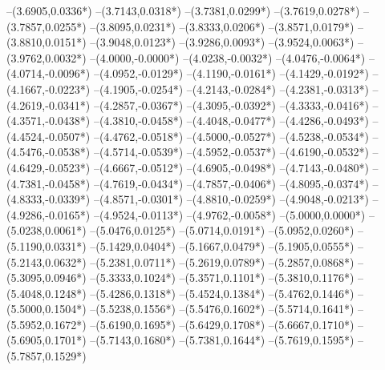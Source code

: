 {	--(3.6905,{0.0336*\yskala})
	--(3.7143,{0.0318*\yskala})
	--(3.7381,{0.0299*\yskala})
	--(3.7619,{0.0278*\yskala})
	--(3.7857,{0.0255*\yskala})
	--(3.8095,{0.0231*\yskala})
	--(3.8333,{0.0206*\yskala})
	--(3.8571,{0.0179*\yskala})
	--(3.8810,{0.0151*\yskala})
	--(3.9048,{0.0123*\yskala})
	--(3.9286,{0.0093*\yskala})
	--(3.9524,{0.0063*\yskala})
	--(3.9762,{0.0032*\yskala})
	--(4.0000,{-0.0000*\yskala})
	--(4.0238,{-0.0032*\yskala})
	--(4.0476,{-0.0064*\yskala})
	--(4.0714,{-0.0096*\yskala})
	--(4.0952,{-0.0129*\yskala})
	--(4.1190,{-0.0161*\yskala})
	--(4.1429,{-0.0192*\yskala})
	--(4.1667,{-0.0223*\yskala})
	--(4.1905,{-0.0254*\yskala})
	--(4.2143,{-0.0284*\yskala})
	--(4.2381,{-0.0313*\yskala})
	--(4.2619,{-0.0341*\yskala})
	--(4.2857,{-0.0367*\yskala})
	--(4.3095,{-0.0392*\yskala})
	--(4.3333,{-0.0416*\yskala})
	--(4.3571,{-0.0438*\yskala})
	--(4.3810,{-0.0458*\yskala})
	--(4.4048,{-0.0477*\yskala})
	--(4.4286,{-0.0493*\yskala})
	--(4.4524,{-0.0507*\yskala})
	--(4.4762,{-0.0518*\yskala})
	--(4.5000,{-0.0527*\yskala})
	--(4.5238,{-0.0534*\yskala})
	--(4.5476,{-0.0538*\yskala})
	--(4.5714,{-0.0539*\yskala})
	--(4.5952,{-0.0537*\yskala})
	--(4.6190,{-0.0532*\yskala})
	--(4.6429,{-0.0523*\yskala})
	--(4.6667,{-0.0512*\yskala})
	--(4.6905,{-0.0498*\yskala})
	--(4.7143,{-0.0480*\yskala})
	--(4.7381,{-0.0458*\yskala})
	--(4.7619,{-0.0434*\yskala})
	--(4.7857,{-0.0406*\yskala})
	--(4.8095,{-0.0374*\yskala})
	--(4.8333,{-0.0339*\yskala})
	--(4.8571,{-0.0301*\yskala})
	--(4.8810,{-0.0259*\yskala})
	--(4.9048,{-0.0213*\yskala})
	--(4.9286,{-0.0165*\yskala})
	--(4.9524,{-0.0113*\yskala})
	--(4.9762,{-0.0058*\yskala})
	--(5.0000,{0.0000*\yskala})
	--(5.0238,{0.0061*\yskala})
	--(5.0476,{0.0125*\yskala})
	--(5.0714,{0.0191*\yskala})
	--(5.0952,{0.0260*\yskala})
	--(5.1190,{0.0331*\yskala})
	--(5.1429,{0.0404*\yskala})
	--(5.1667,{0.0479*\yskala})
	--(5.1905,{0.0555*\yskala})
	--(5.2143,{0.0632*\yskala})
	--(5.2381,{0.0711*\yskala})
	--(5.2619,{0.0789*\yskala})
	--(5.2857,{0.0868*\yskala})
	--(5.3095,{0.0946*\yskala})
	--(5.3333,{0.1024*\yskala})
	--(5.3571,{0.1101*\yskala})
	--(5.3810,{0.1176*\yskala})
	--(5.4048,{0.1248*\yskala})
	--(5.4286,{0.1318*\yskala})
	--(5.4524,{0.1384*\yskala})
	--(5.4762,{0.1446*\yskala})
	--(5.5000,{0.1504*\yskala})
	--(5.5238,{0.1556*\yskala})
	--(5.5476,{0.1602*\yskala})
	--(5.5714,{0.1641*\yskala})
	--(5.5952,{0.1672*\yskala})
	--(5.6190,{0.1695*\yskala})
	--(5.6429,{0.1708*\yskala})
	--(5.6667,{0.1710*\yskala})
	--(5.6905,{0.1701*\yskala})
	--(5.7143,{0.1680*\yskala})
	--(5.7381,{0.1644*\yskala})
	--(5.7619,{0.1595*\yskala})
	--(5.7857,{0.1529*\yskala})
}
